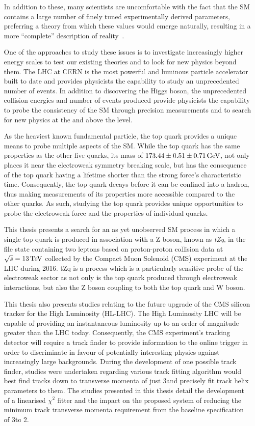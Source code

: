 In addition to these, many scientists are uncomfortable with the fact that the SM contains a large number of finely tuned experimentally derived parameters, preferring a theory from which these values would emerge naturally, resulting in a more ``complete'' description of reality~\cite{Burdman:2007ck}.

One of the approaches to study these issues is to investigate increasingly higher energy scales to test our existing theories and to look for new physics beyond them.
The LHC at CERN is the most powerful and luminous particle accelerator built to date and provides physicists the capability to study an unprecedented number of events.
In addition to discovering the Higgs boson, the unprecedented collision energies and number of events produced provide physicists the capability to probe the consistency of the SM through precision measurements and to search for new physics at the and above the \TeV level.

As the heaviest known fundamental particle, the top quark provides a unique means to probe multiple aspects of the SM.
While the top quark has the same properties as the other five quarks, its mass of $173.44 \pm 0.51 \pm 0.71 \,\text{Ge\hspace{-.08em}V}$, not only places it near the electroweak symmetry breaking scale, but has the consequence of the top quark having a lifetime shorter than the strong force's characteristic time.
Consequently, the top quark decays before it can be confined into a hadron, thus making measurements of its properties more accessible compared to the other quarks.
As such, studying the top quark provides unique opportunities to probe the electroweak force and the properties of individual quarks.

This thesis presents a search for an as yet unobserved SM process in which a single top quark is produced  in association with a Z boson, known as \emph{tZq}, in the file state containing two leptons based on proton-proton collision data at $\sqrt{s} = 13\,\text{Te\hspace{-.08em}V}$ collected by the Compact Muon Solenoid (CMS) experiment at the LHC during 2016.
tZq is a process which is a particularly sensitive probe of the electroweak sector as not only is the top quark produced through electroweak interactions, but also the Z boson coupling to both the top quark and W boson.

This thesis also presents studies relating to the future upgrade of the CMS silicon tracker for the High Luminosity (HL-LHC).
The High Luminosity LHC will be capable of providing an instantaneous luminosity up to an order of magnitude greater than the LHC today.
Consequently, the CMS experiment's tracking detector will require a track finder to provide information to the online trigger in order to discriminate in favour of potentially interesting physics against increasingly large backgrounds.
During the development of one possible track finder, studies were undertaken regarding various track fitting algorithm would best find tracks down to transverse momenta of just 3\GeV and precisely fit track helix parameters to them.
The studies presented in this thesis detail the development of a linearised $\chi^{2}$ fitter and the impact on the proposed system of reducing the minimum track transverse momenta requirement from the baseline specification of 3\GeV to 2\GeV.
